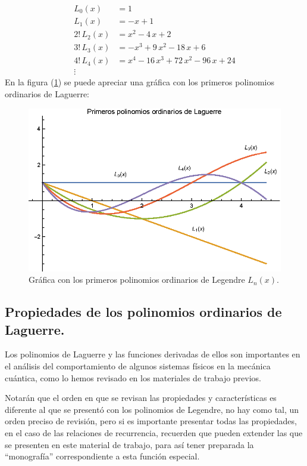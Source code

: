 \begin{align*}
L_{0} (x) &= 1 \\[0.5em]
L_{1} (x) &= -x + 1 \\[0.5em]
2! \, L_{2} (x) &= x^{2} - 4 \, x + 2 \\[0.5em]
3! \, L_{3} (x) &= -x^{3} + 9 \, x^{2} - 18 \, x + 6 \\[0.5em]
4! \, L_{4} (x) &= x^{4} -16 \, x^{3} + 72 \, x^{2} - 96 \, x + 24 \\[0.5em]
\vdots
\end{align*}
En la figura (\ref{fig:grafica_Laguerre_01}) se puede apreciar una gráfica con los primeros polinomios ordinarios de Laguerre:
\begin{figure}[H]
    \centering
    \includegraphics[scale=1]{Imagenes/Polinomios_Laguerre_03.eps}
    \caption{Gráfica con los primeros polinomios ordinarios de Legendre $L_{n}(x)$.}
    \label{fig:grafica_Laguerre_01}
\end{figure}

\subsection{Propiedades de los polinomios ordinarios de Laguerre.}
Los polinomios de Laguerre y las funciones derivadas de ellos son importantes en el análisis del comportamiento de algunos sistemas físicos en la mecánica cuántica, como lo hemos revisado en los materiales de trabajo previos.
\par
Notarán que el orden en que se revisan las propiedades y características es diferente al que se presentó con los polinomios de Legendre, no hay como tal, un orden preciso de revisión, pero si es importante presentar todas las propiedades, en el caso de las relaciones de recurrencia, recuerden que pueden extender las que se presenten en este material de trabajo, para así tener preparada la \enquote{monografía} correspondiente a esta función especial.
